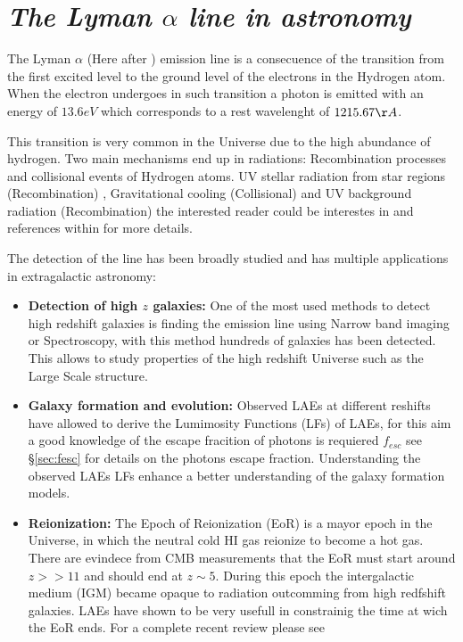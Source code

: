  

\section{\emph{The Lyman $\alpha$ line in astronomy}}\label{sec:lyuses}

The Lyman $\alpha$ (Here after \ly) emission line is a consecuence of the 
transition 
from the first excited level to the ground level of the electrons
in the Hydrogen atom. When the electron undergoes in such transition 
a photon is emitted with an energy of $13.6eV$ which corresponds to 
a rest wavelenght of $1215.67 \AA$. 

This transition is very common in the Universe due to the high abundance
of hydrogen. Two main mechanisms end up in \ly radiations: Recombination 
processes and collisional events of Hydrogen atoms. UV stellar radiation
from star regions (Recombination) , Gravitational 
cooling (Collisional) and UV background radiation (Recombination) the interested
reader could be interestes in\citep{LaursenPhD} and references within for
more details. 

The detection of the \ly line has been broadly studied and has multiple 
applications in extragalactic astronomy:

\begin{itemize}
\item {\bf{Detection of high $z$ galaxies:}} One of the most used 
methods to detect high redshift galaxies is finding the \ly emission 
line using Narrow band imaging or Spectroscopy, with this method 
hundreds of galaxies has been detected. This 
allows to study properties of the high redshift Universe such as
the Large Scale structure. 
 
\item {\bf{Galaxy formation and evolution:}} Observed LAEs at different
reshifts have allowed to derive the Lumimosity Functions (LFs) of LAEs, 
for this aim a good knowledge of the escape fracition of 
photons is requiered $f_{esc}$ see \S \ref{sec:fesc} for details on the \ly
photons escape fraction. Understanding the observed LAEs LFs enhance a
better understanding of the galaxy formation models. 

\item {\bf{Reionization:}} The Epoch of Reionization (EoR) is a mayor
epoch in the Universe, in which the neutral cold HI gas reionize to 
become a hot gas. There are evindece from CMB measurements that 
the EoR must start around $z >> 11$ and should end at $z\sim5$. During this 
epoch the intergalactic medium (IGM) became opaque to \ly radiation 
outcomming from high redfshift galaxies. LAEs have shown to be 
very usefull in constrainig the time at wich the EoR ends. For a complete
recent review please see \citep{review}
 
\end{itemize}


